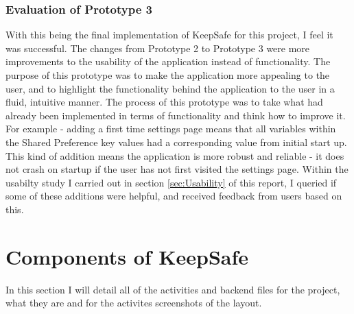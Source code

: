 \documentclass[a4paper]{report}
\begin{document}
\subsection{Evaluation of Prototype 3}
\label{sec:EvalPrototype3}
With this being the final implementation of KeepSafe for this project, I feel it was successful. The changes from Prototype 2 to Prototype 3 were more improvements to the usability of the application instead of functionality. The purpose of this prototype was to make the application more appealing to the user, and to highlight the functionality behind the application to the user in a fluid, intuitive manner. The process of this prototype was to take what had already been implemented in terms of functionality and think how to improve it. For example - adding a first time settings page means that all variables within the Shared Preference key values had a corresponding value from initial start up. This kind of addition means the application is more robust and reliable - it does not crash on startup if the user has not first visited the settings page. Within the usabilty study I carried out in section \ref{sec:Usability} of this report, I queried if some of these additions were helpful, and received feedback from users based on this. 
\chapter{Components of KeepSafe}
\label{sec:Components}
In this section I will detail all of the activities and backend files for the project, what they are and for the activites screenshots of the layout. 
\end{document}
